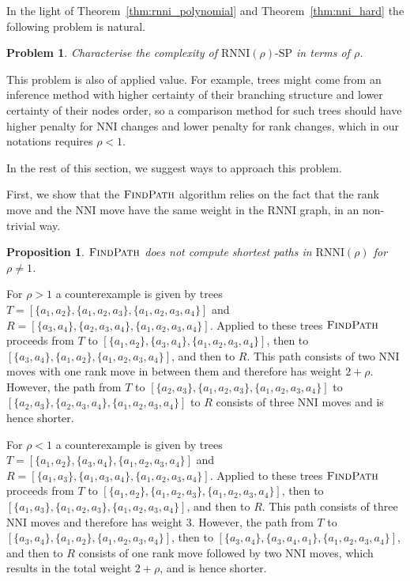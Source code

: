 \documentclass[11pt]{amsart}
\newtheorem{proposition}{Proposition}
\newtheorem{problem}{Problem}
\newcommand{\rnni}{\mathrm{RNNI}}
\newcommand{\findpath}{\textsc{FindPath}}
\newcommand{\nni}{\mathrm{NNI}}
\newcommand{\decprob}[1]{\rnni(#1)\text{-}\mathrm{SP}}
\begin{document}
In the light of Theorem~\ref{thm:rnni_polynomial} and Theorem~\ref{thm:nni_hard} the following problem is natural.

\begin{problem}
Characterise the complexity of $\decprob{\rho}$ in terms of $\rho$.
\label{prblm:rho_range}
\end{problem}

This problem is also of applied value.
For example, trees might come from an inference method with higher certainty of their branching structure and lower certainty of their nodes order, so a comparison method for such trees should have higher penalty for $\nni$ changes and lower penalty for rank changes, which in our notations requires $\rho < 1$.

In the rest of this section, we suggest ways to approach this problem.

First, we show that the $\findpath$ algorithm relies on the fact that the rank move and the $\nni$ move have the same weight in the $\rnni$ graph, in an non-trivial way.

\begin{proposition}
$\findpath$ does not compute shortest paths in $\rnni(\rho)$ for $\rho \neq 1$.
\label{prop:fp_only_rnni}
\end{proposition}

\proof
For $\rho > 1$ a counterexample is given by trees\\
$T = [\{a_1,a_2\},\{a_1,a_2,a_3\},\{a_1,a_2,a_3,a_4\}]$ and\\
$R = [\{a_3,a_4\},\{a_2,a_3,a_4\},\{a_1,a_2,a_3,a_4\}]$.
Applied to these trees $\findpath$ proceeds from $T$ to $[\{a_1,a_2\},\{a_3,a_4\},\{a_1,a_2,a_3,a_4\}]$, then to $[\{a_3,a_4\},\{a_1,a_2\},\{a_1,a_2,a_3,a_4\}]$, and then to $R$.
This path consists of two $\nni$ moves with one rank move in between them and therefore has weight $2 + \rho$.
However, the path from $T$ to $[\{a_2,a_3\},\{a_1,a_2,a_3\},\{a_1,a_2,a_3,a_4\}]$ to $[\{a_2,a_3\},\{a_2,a_3,a_4\},\{a_1,a_2,a_3,a_4\}]$ to $R$ consists of three $\nni$ moves and is hence shorter.

For $\rho < 1$ a counterexample is given by trees\\
$T = [\{a_1,a_2\},\{a_3,a_4\},\{a_1,a_2,a_3,a_4\}]$ and\\
$R = [\{a_1,a_3\},\{a_1,a_3,a_4\},\{a_1,a_2,a_3,a_4\}]$.
Applied to these trees $\findpath$ proceeds from $T$ to $[\{a_1,a_2\},\{a_1,a_2,a_3\},\{a_1,a_2,a_3,a_4\}]$, then to $[\{a_1,a_3\},\{a_1,a_2,a_3\},\{a_1,a_2,a_3,a_4\}]$, and then to $R$.
This path consists of three $\nni$ moves and therefore has weight $3$.
However, the path from $T$ to $[\{a_3,a_4\},\{a_1,a_2\},\{a_1,a_2,a_3,a_4\}]$, then to $[\{a_3,a_4\},\{a_3,a_4,a_1\},\{a_1,a_2,a_3,a_4\}]$, and then to $R$ consists of one rank move followed by two $\nni$ moves, which results in the total weight $2+\rho$, and is hence shorter.
\endproof
\end{document}
